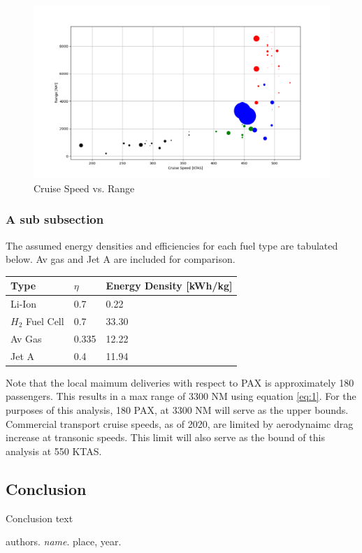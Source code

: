 \documentclass[12pt]{article} %
\begin{document}
\begin{figure}[h]
\begin{center}
\includegraphics[width=1\textwidth]{speed_v_range}
\end{center}
\caption{Cruise Speed vs. Range}
\end{figure}

\subsubsection{A sub subsection}

The assumed energy densities and efficiencies for each fuel type are tabulated below. Av gas and Jet A are included for comparison.

\begin{center}
\begin{tabular}{ | m{3cm} | m{3cm}| m{3cm} | } 
\hline
Type& $\eta$ & Energy Density [kWh/kg]\\ 
\hline
Li-Ion& 0.7 & 0.22 \\ 
\hline
$H_{2}$ Fuel Cell & 0.7 & 33.30 \\ 
\hline
Av Gas & 0.335 & 12.22 \\ 
\hline
Jet A & 0.4 & 11.94 \\ 
\hline
\end{tabular}
\end{center}

Note that the local maimum deliveries with respect to PAX is approximately 180 passengers. This results in a max range of 3300 NM using equation \ref{eq:1}. For the purposes of this analysis, 180 PAX, at 3300 NM will serve as the upper bounds. Commercial transport cruise speeds, as of 2020, are limited by aerodynaimc drag increase at transonic speeds. This limit will also serve as the bound of this analysis at 550 KTAS.

\subsection{Conclusion}

Conclusion text

\pagebreak

\begin{thebibliography}{9}
authors. 
\textit{name}. 
place, year.
\end{thebibliography}
\end{document}

